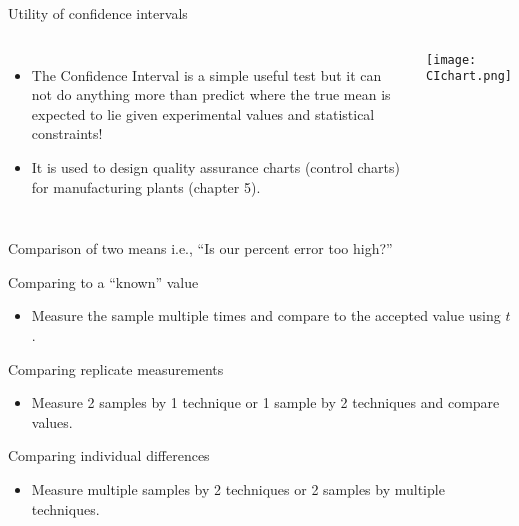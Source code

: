 \documentclass[notes=show]{beamer}
\begin{document}
\begin{frame}{Utility of confidence intervals}
	\begin{columns}
	\begin{itemize}
		\item The Confidence Interval is a simple useful test but it can
			not do anything more than \alert{predict} where the true
			mean is expected to lie given experimental values and
			statistical constraints!
		\item It is used to design quality assurance charts (control
			charts) for manufacturing plants (chapter 5).
	\end{itemize}
		\texttt{[image: CIchart.png]}
	\end{columns}
\end{frame}

\begin{frame}{Comparison of two means}
	{i.e., ``Is our percent error \alert{too} high?''}

	\begin{description}[<+->]
		\item[Case 1:] Comparing to a ``known'' value
		        \begin{itemize}[<1->]
		        	\item Measure the sample multiple times and
		        		compare to the accepted value using $t$.
		        \end{itemize}
		\item[Case 2:] Comparing replicate measurements
		        \begin{itemize}[<1->]
		        	\item Measure 2 samples by 1 technique or 1
		        		sample by 2 techniques and compare
		        		values.
		        \end{itemize}
		\item[Case 3:] Comparing individual differences
			\begin{itemize}[<1->]
				\item Measure multiple samples by 2 techniques
					or 2 samples by multiple techniques.
			\end{itemize}
	\end{description}
\end{frame}
\end{document}
